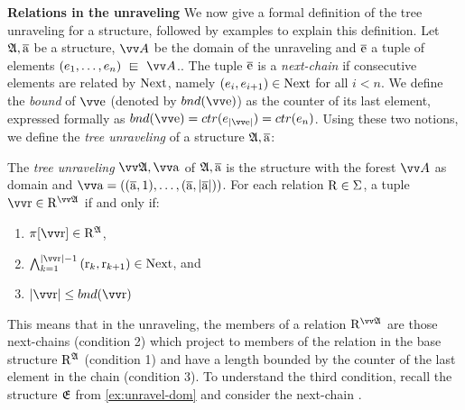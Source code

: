 \noindent
\textbf{Relations in the unraveling}
We now give a formal definition of the tree unraveling for a structure, followed by examples to explain this definition.
Let ${\mathfrak{A}}, \overline{\mathrm{a}}$ be a structure, $\unraveldom{A}$ be the domain of the unraveling and $\overline{\mathrm{e}}$ a tuple of elements $(e_{1}, \ldots, e_{n}) \sqin \unraveldom{A}$..
The tuple $\overline{\mathrm{e}}$ is a \emph{next-chain} if consecutive elements are related by $\mathrm{Next}$, namely $(e_{i}, e_{i+1}) \in \mathrm{Next}$ for all $i < n$.
We define the \emph{bound} of $\elemtuptuplee$ (denoted by $\bound{\elemtuptuplee}$) as the counter of its last element, expressed formally as $\bound{\elemtuptuplee} = \ctr{e_{|\elemtuptuplee|}} = \ctr{e_{n}}$.
Using these two notions, we define the \emph{tree unraveling} of a structure ${\mathfrak{A}}, \overline{\mathrm{a}}$:
\begin{samepage}
\begin{definition}\label{def:tree-unraveling}
The \emph{tree unraveling} $\unravel{A}, \elemtuptuplea$ of ${\mathfrak{A}}, \overline{\mathrm{a}}$ is the structure with the forest $\unraveldom{A}$ as domain and $\elemtuptuplea = ((\elemtuplea, 1), \ldots, (\elemtuplea, |\elemtuplea|))$.
For each relation $\mathrm{R} \in \Sigma$, a tuple $\elemtuptupler \in \relR^{\unravel{A}}$ if and only if:
\begin{enumerate}
  \item $\pi[\elemtuptupler] \in \relR^{\str{A}}$,
  \item $\bigwedge_{k=1}^{|\elemtuptupler|-1}{(\elemr_{k},\elemr_{k+1}) \in \relNext}$, and
  \item $|\elemtuptupler| \le \bound{\elemtuptupler}$
\end{enumerate}
\end{definition}
\end{samepage}
This means that in the unraveling, the members of a relation $\relR^{\unravel{A}}$ are those next-chains (condition 2) which project to members of the relation in the base structure $\mathrm{R}^{{\mathfrak{A}}}$ (condition 1) and have a length bounded by the counter of the last element in the chain (condition 3).
To understand the third condition, recall the structure ${\mathfrak{E}}$ from \cref{ex:unravel-dom} and consider the next-chain .
